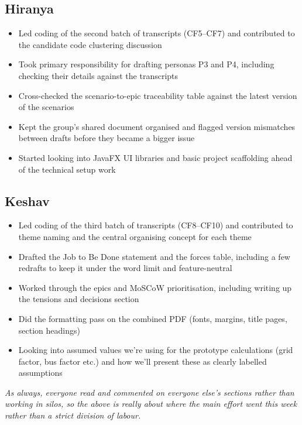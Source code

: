 \documentclass[11pt,a4paper]{article}
\begin{document}
\subsection*{Hiranya}
\begin{itemize}
    \item Led coding of the second batch of transcripts (CF5--CF7) and contributed to the candidate code clustering discussion
    \item Took primary responsibility for drafting personas P3 and P4, including checking their details against the transcripts
    \item Cross-checked the scenario-to-epic traceability table against the latest version of the scenarios
    \item Kept the group's shared document organised and flagged version mismatches between drafts before they became a bigger issue
    \item Started looking into JavaFX UI libraries and basic project scaffolding ahead of the technical setup work
\end{itemize}

\subsection*{Keshav}
\begin{itemize}
    \item Led coding of the third batch of transcripts (CF8--CF10) and contributed to theme naming and the central organising concept for each theme
    \item Drafted the Job to Be Done statement and the forces table, including a few redrafts to keep it under the word limit and feature-neutral
    \item Worked through the epics and MoSCoW prioritisation, including writing up the tensions and decisions section
    \item Did the formatting pass on the combined PDF (fonts, margins, title pages, section headings)
    \item Looking into assumed values we're using for the prototype calculations (grid factor, bus factor etc.) and how we'll present these as clearly labelled assumptions
\end{itemize}

\vspace{6pt}
\textit{As always, everyone read and commented on everyone else's sections rather than working in silos, so the above is really about where the main effort went this week rather than a strict division of labour.}
\end{document}
